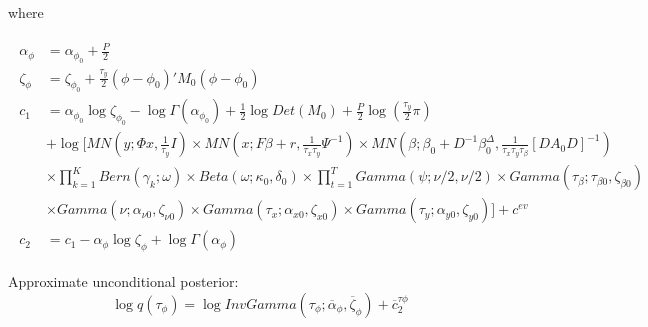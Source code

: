 \documentclass[11pt]{article}
\begin{document}
where

\begin{align*}
\begin{split}
	\alpha_{\phi}	&=	\alpha_{\phi_0}+\frac{P}{2}\\
	\zeta_{\phi}	&=	\zeta_{\phi_0}+\frac{\tau_{y}}{2}\left(\phi-\phi_{0}\right)'M_{0}\left(\phi-\phi_{0}\right)\\
	c_{1}			&=	\alpha_{\phi_0}\log\zeta_{\phi_0}-\log\Gamma\left(\alpha_{\phi_0}\right)+\frac{1}{2}\log Det\left(M_{0}\right)+\frac{P}{2}\log\left(\frac{\tau_{y}}{2}\pi\right)\\
				&+\log\Bigg[MN\left(y;\Phi x,\frac{1}{\tau_{y}}I\right)\times MN\left(x;F\beta+r,\frac{1}{\tau_{x}\tau_{y}}\Psi^{-1}\right)\times MN\left(\beta;\beta_{0}+D^{-1}\beta_{0}^{\Delta},\frac{1}{\tau_{x}\tau_{y}\tau_{\beta}}\left[DA_{0}D\right]^{-1}\right)\\
				&\times\prod_{k=1}^{K}Bern\left(\gamma_{k};\omega\right)\times Beta\left(\omega;\kappa_{0},\delta_{0}\right)\times\prod_{t=1}^{T}Gamma\left(\psi;\nu/2,\nu/2\right)\times Gamma\left(\tau_{\beta};\tau_{\beta0},\zeta_{\beta0}\right)\\
				&\times Gamma\left(\nu;\alpha_{\nu0},\zeta_{\nu0}\right)\times Gamma\left(\tau_{x};\alpha_{x0},\zeta_{x0}\right)\times Gamma\left(\tau_{y};\alpha_{y0},\zeta_{y0}\right)\Bigg]+c^{ev}\\
	c_{2}			&=	c_{1}-\alpha_{\phi}\log\zeta_{\phi}+\log\Gamma\left(\alpha_{\phi}\right)
\end{split}
\end{align*}

Approximate unconditional posterior:
\begin{equation}
	\log q\left(\tau_{\phi}\right) = \log InvGamma\left(\tau_{\phi};\overline{\alpha}_{\phi},\overline{\zeta}_{\phi}\right)+\overline{c}_{2}^{\tau\phi}
\end{equation}
\end{document}
